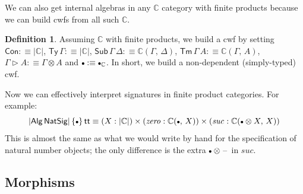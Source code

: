 \documentclass[12pt,a4paper,twoside,openany]{book}
\theoremstyle{remark}
\theoremstyle{definition}
\newtheorem{mydefinition}{Definition}
\theoremstyle{theorem}
\newcommand{\mi}[1]{\mathit{#1}}
\newcommand{\ms}[1]{\mathsf{#1}}
\newcommand{\mbb}[1]{\mathbb{#1}}
\newcommand{\Con}{\mathsf{Con}}
\newcommand{\Sub}{\mathsf{Sub}}
\newcommand{\Tm}{\mathsf{Tm}}
\newcommand{\Ty}{\mathsf{Ty}}
\renewcommand{\tt}{\mathsf{tt}}
\newcommand{\blank}{\mathord{\hspace{1pt}\text{--}\hspace{1pt}}}
\newcommand{\ext}{\triangleright}
\newcommand{\emptycon}{\scaleobj{.75}\bullet}
\newcommand{\Alg}{\ms{Alg}}
\newcommand{\mbbC}{\mbb{C}}
\newcommand{\defn}{:\equiv}
\begin{document}
We can also get internal algebras in any $\mbbC$ category with finite products
because we can build cwfs from all such $\mbbC$.

\begin{mydefinition} Assuming $\mbbC$ with finite products, we build a cwf by setting
$\Con \defn |\mbbC|$, $\Ty\,\Gamma \defn |\mbbC|$, $\Sub\,\Gamma\,\Delta \defn \mbbC(\Gamma,\,\Delta)$, $\Tm\,\Gamma\,A \defn \mbbC(\Gamma,\,A)$, $\Gamma \ext A \defn \Gamma \otimes A$ and $\emptycon \defn \emptycon_{\mbbC}$. In short, we build a non-dependent (simply-typed) cwf.
\end{mydefinition}

Now we can effectively interpret signatures in finite product categories. For
example:
\[
|\Alg\,\ms{NatSig}|\,\{\emptycon\}\,\tt \equiv
(X : |\mbbC|) \times (\mi{zero} : \mbbC(\emptycon,\,X)) \times (\mi{suc} : \mbbC(\emptycon \otimes X,\,X))
\]
This is almost the same as what we would write by hand for the specification of
natural number objects; the only difference is the extra $\emptycon
\otimes\blank$ in $\mi{suc}$.

\subsection{Morphisms}
\end{document}
